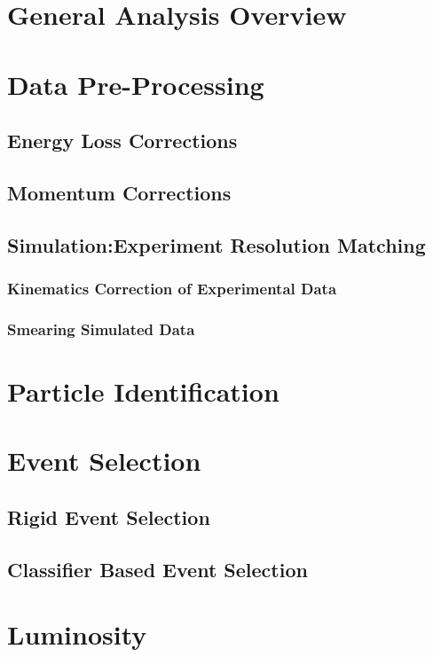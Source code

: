 \section{General Analysis Overview}

\section{Data Pre-Processing}
    \subsection{Energy Loss Corrections}
    \subsection{Momentum Corrections}
    \subsection{Simulation:Experiment Resolution Matching}
        \subsubsection{Kinematics Correction of Experimental Data}
        \subsubsection{Smearing Simulated Data}

\section{Particle Identification}

\section{Event Selection}
    \subsection{Rigid Event Selection}
    \subsection{Classifier Based Event Selection}

\section{Luminosity}

